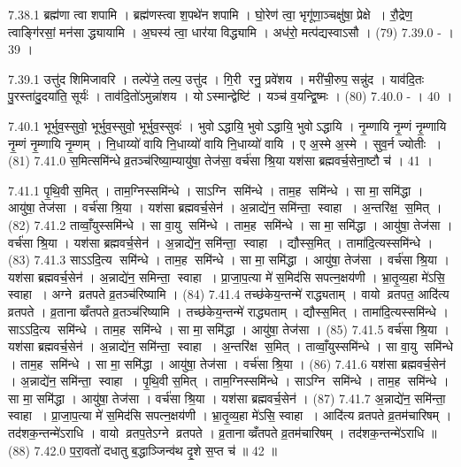 7.38.1
ब्रह्म॑णा त्वा शपामि । ब्रह्म॑णस्त्वा श॒पथे॑न शपामि । घो॒रेण॑ त्वा॒ भृगू॑णा॒ञ्चक्षु॑षा॒ प्रेक्षे । रौ॒द्रेण॒ त्वाङ्गि॑रसां॒ मन॑सा द्ध्यायामि । अ॒घस्य॑ त्वा॒ धार॑या विद्ध्यामि । अध॑रो॒ मत्प॑द्यस्वाऽसौ । (79)
7.39.0
- । 39 ।
\anuvakamend

7.39.1
उत्तु॑द शिमिजावरि । तल्पे॑जे॒ तल्प॒ उत्तु॑द । गि॒री रनु॒ प्रवे॑शय । मरी॑ची॒रुप॒ सन्नु॑द । याव॑दि॒तः पु॒रस्ता॑दु॒दया॑ति॒ सूर्यः॑ । ताव॑दि॒तो॑ऽमुन्ना॑शय । योऽस्मान्द्वेष्टि॑ । यञ्च॑ व॒यन्द्वि॒ष्मः । (80)
7.40.0
- । 40 ।
\anuvakamend

7.40.1
भूर्भुव॒स्सुवो॒ भूर्भुव॒स्सुवो॒ भूर्भुव॒स्सुवः॑ । भुवोऽद्धायि॒ भुवोऽद्धायि॒ भुवोऽद्धायि । नृ॒म्णायि नृ॒म्णं नृ॒म्णायि नृ॒म्णं नृ॒म्णायि नृ॒म्णम् । नि॒धाय्यो॑ वायि नि॒धाय्यो॑ वायि नि॒धाय्यो॑ वायि । ए अ॒स्मे अ॒स्मे । सुव॒र्न ज्योतीः । (81)
7.41.0
स॒मित्समि॑न्धे व्र॒तञ्च॑रिष्या॒म्यायु॑षा॒ तेज॑सा॒ वर्च॑सा श्रि॒या यश॑सा ब्रह्मवर्च॒सेना॒ष्टौ च॑ । 41 ।
\anuvakamend

7.41.1
पृ॒थि॒वी स॒मित् । ताम॒ग्निस्समि॑न्धे । साऽग्नि समि॑न्धे । ताम॒ह समि॑न्धे । सा मा॒ समि॑द्धा । आयु॑षा॒ तेज॑सा । वर्च॑सा श्रि॒या । यश॑सा ब्रह्मवर्च॒सेन॑ । अ॒न्नाद्ये॑न॒ समि॑न्ता॒ स्वाहा । अ॒न्तरि॑क्ष॒ स॒मित् । (82)
7.41.2
ताव्वाँ॒युस्समि॑न्धे । सा वा॒यु समि॑न्धे । ताम॒ह समि॑न्धे । सा मा॒ समि॑द्धा । आयु॑षा॒ तेज॑सा । वर्च॑सा श्रि॒या । यश॑सा ब्रह्मवर्च॒सेन॑ । अ॒न्नाद्ये॑न॒ समि॑न्ता॒ स्वाहा । द्यौस्स॒मित् । तामा॑दि॒त्यस्समि॑न्धे । (83)
7.41.3
साऽऽदि॒त्य समि॑न्धे । ताम॒ह समि॑न्धे । सा मा॒ समि॑द्धा । आयु॑षा॒ तेज॑सा । वर्च॑सा श्रि॒या । यश॑सा ब्रह्मवर्च॒सेन॑ । अ॒न्नाद्ये॑न॒ समिन्ता॒ स्वाहा । प्रा॒जा॒प॒त्या मे॑ स॒मिद॑सि सपत्न॒क्षय॑णी । भ्रा॒तृ॒व्य॒हा मे॑ऽसि॒ स्वाहा । अग्ने व्रतपते व्र॒तञ्च॑रिष्यामि । (84)
7.41.4
तच्छ॑केय॒न्तन्मे॑ राद्ध्यताम् । वायो व्रतपत॒ आदि॑त्य व्रतपते । व्र॒तानाव्व्रँतपते व्र॒तञ्च॑रिष्यामि । तच्छ॑केय॒न्तन्मे॑ राद्ध्यताम् । द्यौस्स॒मित् । तामा॑दि॒त्यस्समि॑न्धे । साऽऽदि॒त्य समि॑न्धे । ताम॒ह समि॑न्धे । सा मा॒ समि॑द्धा । आयु॑षा॒ तेज॑सा । (85)
7.41.5
वर्च॑सा श्रि॒या । यश॑सा ब्रह्मवर्च॒सेन॑ । अ॒न्नाद्ये॑न॒ समि॑न्ता॒ स्वाहा । अ॒न्तरि॑क्ष स॒मित् । ताव्वाँ॒युस्समि॑न्धे । सा वा॒यु समि॑न्धे । ताम॒ह समि॑न्धे । सा मा॒ समि॑द्धा । आयु॑षा॒ तेज॑सा । वर्च॑सा श्रि॒या । (86)
7.41.6
यश॑सा ब्रह्मवर्च॒सेन॑ । अ॒न्नाद्ये॑न॒ समि॑न्ता॒ स्वाहा । पृ॒थि॒वी स॒मित् । ताम॒ग्निस्समि॑न्धे । साऽग्नि समि॑न्धे । ताम॒ह समि॑न्धे । सा मा॒ समि॑द्धा । आयु॑षा॒ तेज॑सा । वर्च॑सा श्रि॒या । यश॑सा ब्रह्मवर्च॒सेन॑ । (87)
7.41.7
अ॒न्नाद्ये॑न॒ समि॑न्ता॒ स्वाहा । प्रा॒जा॒प॒त्या मे॑ स॒मिद॑सि सपत्न॒क्षय॑णी । भ्रा॒तृ॒व्य॒हा मे॑ऽसि॒ स्वाहा । आदि॑त्य व्रतपते व्र॒तम॑चारिषम् । तद॑शक॒न्तन्मे॑ऽराधि । वायो व्रतप॒तेऽग्ने व्रतपते । व्र॒तानाव्व्रँतपते व्र॒तम॑चारिषम् । तद॑शक॒न्तन्मे॑ऽराधि ॥ (88)
7.42.0
प॒रा॒वतो॑ दधातु ब॒द्धाञ्जिन्व॑थ दृ॒शे स॒प्त च॑ ॥ 42 ॥
\anuvakamend


